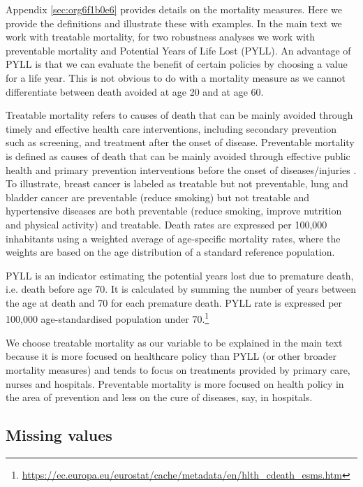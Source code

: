 \documentclass[a4paper,12pt]{article}
\begin{document}
Appendix \ref{sec:org6f1b0e6} provides details on the mortality measures. Here we provide the definitions and illustrate these with examples. In the main text we work with treatable mortality, for two robustness analyses we work with preventable mortality and Potential Years of Life Lost (PYLL). An advantage of PYLL is that we can evaluate the benefit of certain policies by choosing a value for a life year. This is not obvious to do with a mortality measure as we cannot differentiate between death avoided at age 20 and at age 60.

Treatable mortality refers to causes of death that can be mainly avoided through timely and effective health care interventions, including secondary prevention such as screening, and treatment after the onset of disease. Preventable mortality is defined as causes of death that can be mainly avoided through effective public health and primary prevention interventions before the onset of diseases/injuries \citep{countryprofileUK}. To illustrate, breast cancer is labeled as treatable but not preventable, lung and bladder cancer are preventable (reduce smoking) but not treatable and hypertensive diseases are both preventable (reduce smoking, improve nutrition and physical activity) and treatable. Death rates are expressed per 100,000 inhabitants using a weighted average of age-specific mortality rates, where the weights are based on the age distribution of a standard reference population.

PYLL is an indicator estimating the potential years lost due to premature death, i.e. death before age 70. It is calculated by summing the number of years between the age at death and 70 for each premature death. PYLL rate is expressed per 100,000 age-standardised population under 70.\footnote{\url{https://ec.europa.eu/eurostat/cache/metadata/en/hlth\_cdeath\_esms.htm}}

We choose treatable mortality as our variable to be explained in the main text because it is more focused on healthcare policy than PYLL (or other broader mortality measures) and tends to focus on treatments provided by primary care, nurses and hospitals. Preventable mortality is more focused on health policy in the area of prevention and less on the cure of diseases, say, in hospitals.



\subsection{Missing values}
\label{sec:org433f5b2}
\end{document}
